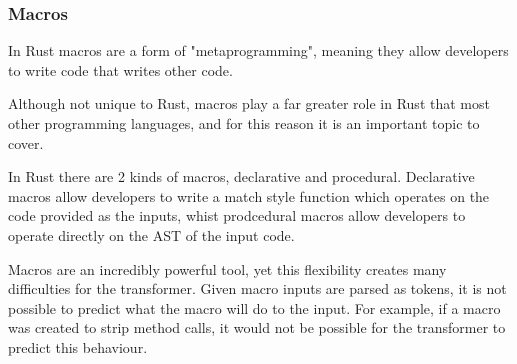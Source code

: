 \documentclass[ oneside,%
                    author={James Elgar},
                    degree={MEng},
                     title={Bidirectional transformer between functional and \\ object-oriented programming in Rust},
                  subtitle={}]{dissertation}
\newcommand{\rust}[1]{\texttt{#1}}
\begin{document}




\subsubsection{Macros}

In Rust macros are a form of "metaprogramming", meaning they allow developers to write code that writes other code. 

Although not unique to Rust, macros play a far greater role in Rust that most other programming languages, and for this reason it is an important topic to cover. 

In Rust there are 2 kinds of macros, declarative and procedural. Declarative macros allow developers to write a match style function which operates on the code provided as the inputs, whist prodcedural macros allow developers to operate directly on the AST of the input code. 

Macros are an incredibly powerful tool, yet this flexibility creates many difficulties for the transformer. Given macro inputs are parsed as tokens, it is not possible to predict what the macro will do to the input. For example, if a macro was created to strip method calls, it would not be possible for the transformer to predict this behaviour.
\end{document}
